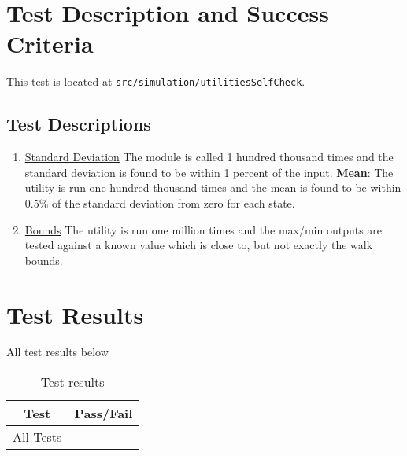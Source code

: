 \section{Test Description and Success Criteria}
This test is located at {\tt src/simulation/utilitiesSelfCheck}. \par

\subsection{Test Descriptions}


\begin{enumerate}
	\item \underline{Standard Deviation} The module is called 1 hundred thousand times and  the standard deviation is found to be within 1 percent of the input.
	\subitem \textbf{Mean}: The utility is run one hundred thousand times and the mean is found to be within 0.5\% of the standard deviation from zero for each state.
	\item \underline{Bounds} The utility is run one million times and the max/min outputs are tested against a known value which is close to, but not exactly the walk bounds.
\end{enumerate} 

\section{Test Results}
All test results below

\begin{table}[H]
	\caption{Test results}
	\label{tab:results}
	\centering \fontsize{10}{10}\selectfont
	\begin{tabular}{ c | c  } %
		\hline
		\textbf{Test} 						  		&\textbf{Pass/Fail} \\ \hline
		All Tests	   			&  \\ \hline
	\end{tabular}

\end{table}



\pagebreak %